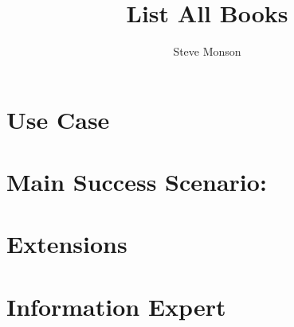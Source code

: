 \documentclass{article}
\title{List All Books}
\author{Steve Monson}
\begin{document}
\maketitle

\section*{Use Case}

\section*{Main Success Scenario:}

\section*{Extensions}

\section*{Information Expert}
\end{document}
